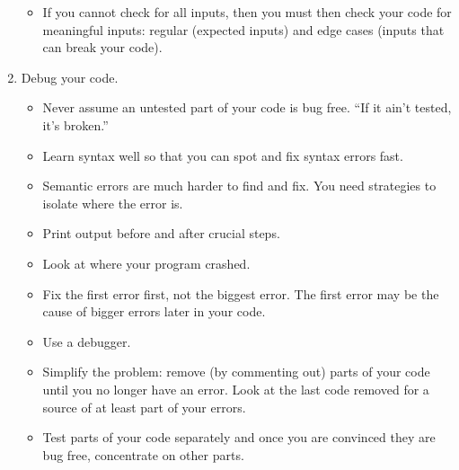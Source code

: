 \documentclass[letterpaper,10pt,english]{sphinxmanual}
\begin{document}
\begin{enumerate}
\begin{itemize}
\item {} 
If you cannot check for all inputs, then you must then check your code
for meaningful inputs: regular (expected inputs) and edge cases (inputs
that can break your code).

\end{itemize}

\item {} 
Debug your code.
\begin{itemize}
\item {} 
Never assume an untested part of your code is bug free. “If it ain’t tested, it’s broken.”

\item {} 
Learn syntax well so that you can spot and fix syntax errors
fast.

\item {} 
Semantic errors are much harder to find and fix. You need
strategies to isolate where the error is.

\item {} 
Print output before and after crucial steps.

\item {} 
Look at where your program crashed.

\item {} 
Fix the first error first, not the biggest error.  The first
error may be the cause of bigger errors later in your code.

\item {} 
Use a debugger.

\item {} 
Simplify the problem: remove (by commenting out) parts of your
code until you no longer have an error.  Look at the last code
removed for a source of at least part of your errors.

\item {} 
Test parts of your code separately and once you are convinced
they are bug free, concentrate on other parts.

\end{itemize}

\end{enumerate}
\end{document}
